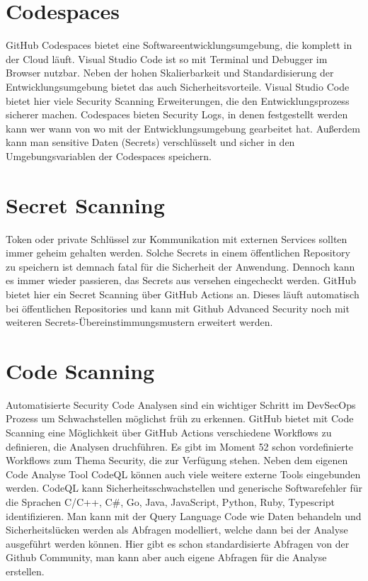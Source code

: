 \section{Codespaces}
GitHub Codespaces bietet eine Softwareentwicklungsumgebung, die komplett in der Cloud läuft. Visual Studio Code ist so mit Terminal und Debugger im Browser nutzbar. Neben der hohen Skalierbarkeit und Standardisierung der Entwicklungsumgebung bietet das auch Sicherheitsvorteile. Visual Studio Code bietet hier viele Security Scanning Erweiterungen, die den Entwicklungsprozess sicherer machen. Codespaces bieten Security Logs, in denen festgestellt werden kann wer wann von wo mit der Entwicklungsumgebung gearbeitet hat. \cite{codespaces-logs} Außerdem kann man sensitive Daten (Secrets) verschlüsselt und sicher in den Umgebungsvariablen der Codespaces speichern. \cite{codespaces-secrets}
\section{Secret Scanning}

Token oder private Schlüssel zur Kommunikation mit externen Services sollten immer geheim gehalten werden. Solche Secrets in einem öffentlichen Repository zu speichern ist demnach fatal für die Sicherheit der Anwendung. Dennoch kann es immer wieder passieren, das Secrets aus versehen eingecheckt werden. GitHub bietet hier ein Secret Scanning über GitHub Actions an. Dieses läuft automatisch bei öffentlichen Repositories und kann mit Github Advanced Security noch mit weiteren Secrets-Übereinstimmungsmustern erweitert werden. \cite{secret-scanning}

\section{Code Scanning}
Automatisierte Security Code Analysen sind ein wichtiger Schritt im DevSecOps Prozess um Schwachstellen möglichst früh zu erkennen. GitHub bietet mit Code Scanning eine Möglichkeit über GitHub Actions verschiedene Workflows zu definieren, die Analysen druchführen. Es gibt im Moment 52 schon vordefinierte Workflows zum Thema Security, die zur Verfügung stehen. Neben dem eigenen Code Analyse Tool CodeQL können auch viele weitere externe Tools eingebunden werden.\cite{code-scanning} CodeQL kann Sicherheitsschwachstellen und generische Softwarefehler für die Sprachen C/C++, C\#, Go, Java, JavaScript, Python, Ruby, Typescript identifizieren. Man kann mit der Query Language Code wie Daten behandeln und Sicherheitslücken werden als Abfragen modelliert, welche dann bei der Analyse ausgeführt werden können. Hier gibt es schon standardisierte Abfragen von der Github Community, man kann aber auch eigene Abfragen für die Analyse erstellen. \cite{codeql}

